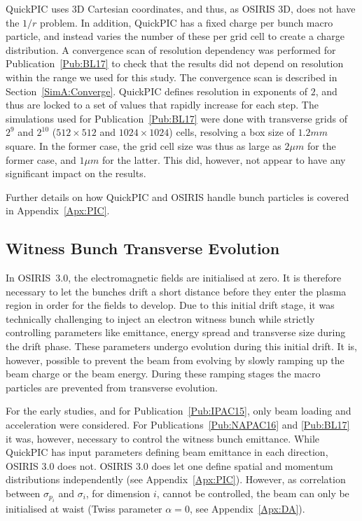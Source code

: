 QuickPIC uses 3D Cartesian coordinates, and thus, as OSIRIS 3D, does not have the $1/r$ problem.
In addition, QuickPIC has a fixed charge per bunch macro particle, and instead varies the number of these per grid cell to create a charge distribution.
A convergence scan of resolution dependency was performed for Publication~\ref{Pub:BL17} to check that the results did not depend on resolution within the range we used for this study. The convergence scan is described in Section~\ref{SimA:Converge}.
QuickPIC defines resolution in exponents of $2$, and thus are locked to a set of values that rapidly increase for each step.
The simulations used for Publication~\ref{Pub:BL17} were done with transverse grids of $2^{9}$ and $2^{10}$ ($512 \times 512$ and $1024 \times 1024$) cells, resolving a box size of $1.2\unit{mm}$ square.
In the former case, the grid cell size was thus as large as $2\unit{\mu m}$ for the former case, and $1\unit{\mu m}$ for the latter.
This did, however, not appear to have any significant impact on the results.

Further details on how QuickPIC and OSIRIS handle bunch particles is covered in Appendix~\ref{Apx:PIC}.

\subsection{Witness Bunch Transverse Evolution}
\label{Sim:EBeam:TEvol}

In OSIRIS~3.0, the electromagnetic fields are initialised at zero.
It is therefore necessary to let the bunches drift a short distance before they enter the plasma region in order for the fields to develop.
Due to this initial drift stage, it was technically challenging to inject an electron witness bunch while strictly controlling parameters like emittance, energy spread and transverse size during the drift phase.
These parameters undergo evolution during this initial drift.
It is, however, possible to prevent the beam from evolving by slowly ramping up the beam charge or the beam energy.
During these ramping stages the macro particles are prevented from transverse evolution.

For the early studies, and for Publication~\ref{Pub:IPAC15}, only beam loading and acceleration were considered.
For Publications~\ref{Pub:NAPAC16} and \ref{Pub:BL17} it was, however, necessary to control the witness bunch emittance.
While QuickPIC has input parameters defining beam emittance in each direction, OSIRIS 3.0 does not.
OSIRIS 3.0 does let one define spatial and momentum distributions independently (see Appendix~\ref{Apx:PIC}).
However, as correlation between $\sigma_{p_{i}}$ and $\sigma_{i}$, for dimension $i$, cannot be controlled, the beam can only be initialised at waist (Twiss parameter $\alpha = 0$, see Appendix~\ref{Apx:DA}).

